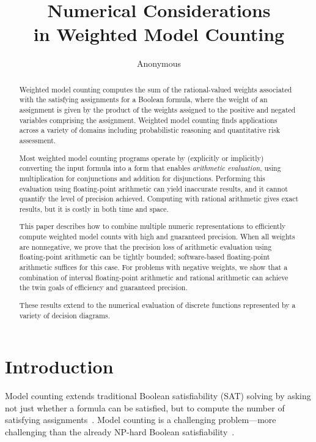 \documentclass[letterpaper,USenglish,cleveref, autoref, thm-restate]{lipics-v2021}
\title{Numerical Considerations \\in Weighted Model Counting}
\author{Anonymous}{Unknown Institution}{}{}{}
\begin{document}
\maketitle

\begin{abstract}
 Weighted model counting computes the sum of the rational-valued weights
  associated with the satisfying assignments for a Boolean formula,
  where the weight of an assignment is given by the product of the
  weights assigned to the positive and negated variables
  comprising the assignment.  Weighted model counting finds
  applications across a variety of domains including probabilistic reasoning
  and quantitative risk assessment.

  Most weighted model counting programs operate by (explicitly or
  implicitly) converting the input formula into a form that enables
  \emph{arithmetic evaluation}, using multiplication for conjunctions
  and addition for disjunctions.  Performing this evaluation using
  floating-point arithmetic can yield inaccurate results, and it
  cannot quantify the level of precision achieved.  Computing with
  rational arithmetic gives exact results, but it is costly in both
  time and space.

  This paper describes how to combine multiple numeric representations
  to efficiently compute weighted model counts with  high and guaranteed precision.
  When all weights are nonnegative, we prove that the precision loss of
  arithmetic evaluation using floating-point arithmetic can be tightly bounded;
  software-based floating-point arithmetic suffices
  for this case.  For problems
  with negative weights, we show that a combination of interval
  floating-point arithmetic and rational arithmetic can achieve the
  twin goals of efficiency and guaranteed precision.

  These results extend to the numerical evaluation of discrete functions represented by a variety of decision diagrams.

\end{abstract}

\section{Introduction}

Model counting extends traditional Boolean satisfiability (SAT) solving by
asking not just whether a formula can be satisfied, but to compute the
number of satisfying assignments~\cite{gomes:hs:2009}.  Model counting is a challenging
problem---more challenging than the already NP-hard Boolean
satisfiability~\cite{valiant:siam:1979}.
\end{document}
